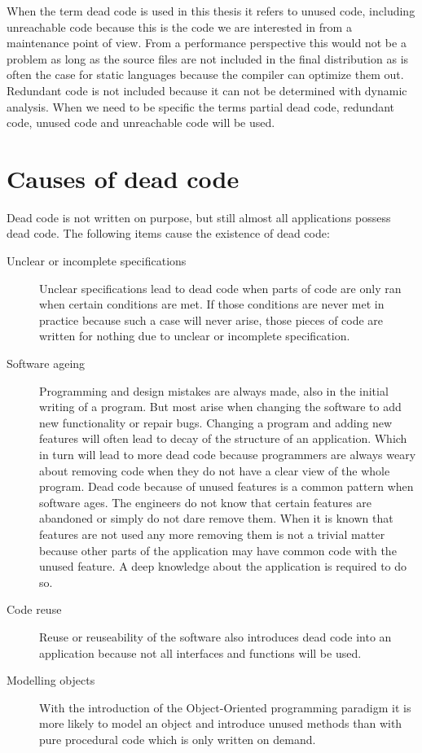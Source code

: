 When the term dead code is used in this thesis it refers to unused code, including unreachable code because this is the code we are interested in from a maintenance point of view. From a performance perspective this would not be a problem as long as the source files are not included in the final distribution as is often the case for static languages because the compiler can optimize them out. Redundant code is not included because it can not be determined with dynamic analysis. When we need to be specific the terms partial dead code, redundant code, unused code and unreachable code will be used.

\section{Causes of dead code}

Dead code is not written on purpose, but still almost all applications possess dead code. The following items cause the existence of dead code: 
\begin{description}

\item [Unclear or incomplete specifications] 
Unclear specifications lead to dead code when parts of code are only ran when certain conditions are met. If those conditions are never met in practice because such a case will never arise, those pieces of code are written for nothing due to unclear or incomplete specification. 

\item [Software ageing]
Programming and design mistakes are always made, also in the initial writing of a program. But most arise when changing the software to add new functionality or repair bugs. Changing a program and adding new features will often lead to decay of the structure of an application\cite{parnas1994}. Which in turn will lead to more dead code because programmers are always weary about removing code when they do not have a clear view of the whole program. Dead code because of unused features is a common pattern when software ages. The engineers do not know that certain features are abandoned or simply do not dare remove them\cite{parnas1994,scanniello2011}. When it is known that features are not used any more removing them is not a trivial matter because other parts of the application may have common code with the unused feature. A deep knowledge about the application is required to do so.

\item [Code reuse]
Reuse or reuseability of the software also introduces dead code into an application because not all interfaces and functions will be used\cite{liu1999,tempero2008}.

\item [Modelling objects]
With the introduction of the Object-Oriented programming paradigm it is more likely to model an object and introduce unused methods than with pure procedural code which is only written on demand\cite{srivastava1992}.
\end{description}

